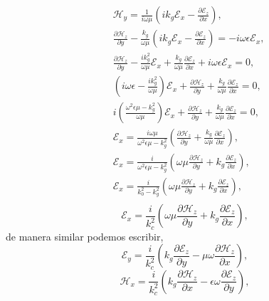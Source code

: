 \documentclass[11pt,fleqn]{book} %
\begin{document}
   \begin{equation*}
  \begin{split}
  & \mathcal{H}_y=\frac{1}{i\omega \mu}\left( ik_g\mathcal{E}_x-\frac{\partial \mathcal{E}_z}{\partial x} \right),\\
  &\frac{\partial \mathcal{H}_z }{\partial y}-\frac{k_g}{\omega \mu}\left( ik_g\mathcal{E}_x-\frac{\partial \mathcal{E}_z}{\partial x} \right)=-i\omega\epsilon \mathcal{E}_{x},\\
  &\frac{\partial \mathcal{H}_z }{\partial y}- \frac{ik_g^2}{\omega \mu}\mathcal{E}_x+\frac{k_g}{\omega \mu}\frac{\partial \mathcal{E}_z}{\partial x} +i\omega\epsilon \mathcal{E}_{x}=0,\\
  &\left( i\omega\epsilon 	- \frac{ik_g^2}{\omega \mu}\right)\mathcal{E}_x+\frac{\partial \mathcal{H}_z }{\partial y}+\frac{k_g}{\omega \mu}\frac{\partial \mathcal{E}_z}{\partial x} =0,\\
  &i\left( \frac{\omega^2\epsilon\mu-k_g^2}{\omega \mu} \right)\mathcal{E}_x+\frac{\partial \mathcal{H}_z }{\partial y}+\frac{k_g}{\omega \mu}\frac{\partial \mathcal{E}_z}{\partial x} =0,\\
  &\mathcal{E}_x= \frac{i\omega \mu}{\omega^2\epsilon\mu-k_g^2} \left( \frac{\partial \mathcal{H}_z }{\partial y}+\frac{k_g}{\omega \mu}\frac{\partial \mathcal{E}_z}{\partial x} \right),\\
  &\mathcal{E}_x= \frac{i}{\omega^2\epsilon\mu-k_g^2} \left(\omega \mu \frac{\partial \mathcal{H}_z }{\partial y}+k_g\frac{\partial \mathcal{E}_z}{\partial x} \right),\\
  &\mathcal{E}_x= \frac{i}{k_0^2-k_g^2} \left(\omega \mu \frac{\partial \mathcal{H}_z }{\partial y}+k_g\frac{\partial \mathcal{E}_z}{\partial x} \right),\\
  \end{split}
  \end{equation*}
  \begin{equation}  \label{A}
  \mathcal{E}_x= \frac{i}{k_c^2} \left(\omega \mu \frac{\partial \mathcal{H}_z }{\partial y}+k_g\frac{\partial \mathcal{E}_z}{\partial x} \right),
  \end{equation}
de manera similar podemos escribir,
\begin{equation}  \label{B}
 \mathcal{E}_y= \frac{i}{k_c^2} \left(k_g \frac{\partial \mathcal{E}_z }{\partial y}-\mu\omega\frac{\partial \mathcal{H}_z}{\partial x} \right),
 \end{equation}
\begin{equation}  \label{C}
 \mathcal{H}_x= \frac{i}{k_c^2} \left(k_g \frac{\partial \mathcal{H}_z }{\partial x}-\epsilon\omega\frac{\partial \mathcal{E}_z}{\partial y} \right),
 \end{equation}
\end{document}
